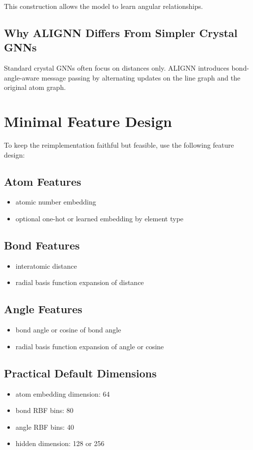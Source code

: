 \documentclass[12pt]{article}
\begin{document}
This construction allows the model to learn angular relationships.

\subsection{Why ALIGNN Differs From Simpler Crystal GNNs}
Standard crystal GNNs often focus on distances only. ALIGNN introduces bond-angle-aware message passing by alternating updates on the line graph and the original atom graph.

\section{Minimal Feature Design}
To keep the reimplementation faithful but feasible, use the following feature design:

\subsection{Atom Features}
\begin{itemize}
    \item atomic number embedding
    \item optional one-hot or learned embedding by element type
\end{itemize}

\subsection{Bond Features}
\begin{itemize}
    \item interatomic distance
    \item radial basis function expansion of distance
\end{itemize}

\subsection{Angle Features}
\begin{itemize}
    \item bond angle or cosine of bond angle
    \item radial basis function expansion of angle or cosine
\end{itemize}

\subsection{Practical Default Dimensions}
\begin{itemize}
    \item atom embedding dimension: 64
    \item bond RBF bins: 80
    \item angle RBF bins: 40
    \item hidden dimension: 128 or 256
\end{itemize}
\end{document}
